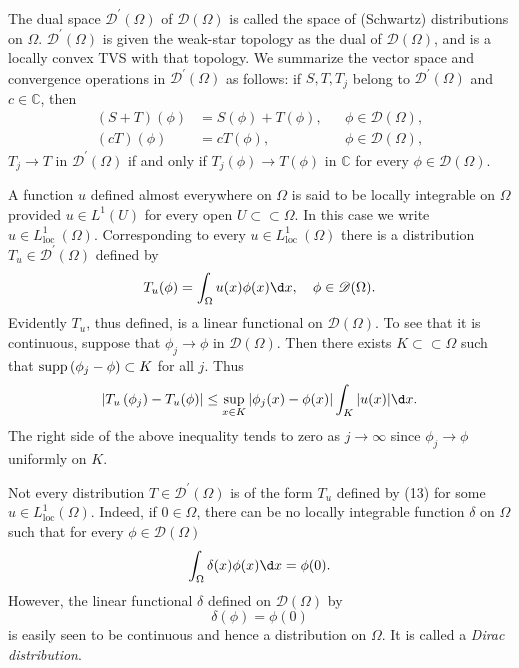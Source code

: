 \begin{para}
  The dual space $\mathscr{D}^{\prime}(\Omega)$ of $\mathscr{D}(\Omega)$ is called the space of 
  (Schwartz) distributions on $\Omega$. $\mathscr{D}^{\prime}(\Omega)$ is given the weak-star 
  topology as the dual of $\mathscr{D}(\Omega)$, and is a locally convex TVS with that topology. 
  We summarize the vector space and convergence operations in $\mathscr{D}^{\prime}(\Omega)$ as 
  follows: if $S, T, T_j$ belong to $\mathscr{D}^{\prime}(\Omega)$ and $c \in \mathbb{C}$, then
  \[
  \begin{aligned}
  (S+T)(\phi) & =S(\phi)+T(\phi), & & \phi \in \mathscr{D}(\Omega), \\
  (c T)(\phi) & =c T(\phi), & & \phi \in \mathscr{D}(\Omega),
  \end{aligned}
  \]
  $T_j \rightarrow T$ in $\mathscr{D}^{\prime}(\Omega)$ if and only if $T_j(\phi) \rightarrow T(\phi)$ in $\mathbb{C}$ for every $\phi \in \mathscr{D}(\Omega)$.
\end{para}


\begin{para}
  A function $u$ defined almost everywhere on $\Omega$ is said to be locally integrable on $\Omega$ provided $u \in L^1(U)$ for every open $U \subset\subset \Omega$. In this case we write $u \in L_{\text {loc }}^1(\Omega)$. Corresponding to every $u \in L_{\text {loc }}^1(\Omega)$ there is a distribution $T_u \in \mathscr{D}^{\prime}(\Omega)$ defined by
  \begin{equation}
    T_u(\phi)=\int_{\Omega} u(x) \phi(x) \d x, \quad \phi \in \mathscr{D}(\Omega).
  \end{equation}
  Evidently $T_u$, thus defined, is a linear functional on $\mathscr{D}(\Omega)$. To see that it is continuous, suppose that $\phi_j \rightarrow \phi$ in $\mathscr{D}(\Omega)$. Then there exists $K \subset\subset \Omega$ such that $\operatorname{supp}\left(\phi_j-\phi\right) \subset K$ for all $j$. Thus
  \[
  \left|T_u\left(\phi_j\right)-T_u(\phi)\right| \leq \sup _{x \in K}\left|\phi_j(x)-\phi(x)\right| \int_K|u(x)| \d x .
  \]
  The right side of the above inequality tends to zero as $j \rightarrow \infty$ since $\phi_j \rightarrow \phi$ uniformly on $K$.
\end{para}

\begin{para}
  Not every distribution $T \in \mathscr{D}^{\prime}(\Omega)$ is of the form $T_u$ defined by (13) for some $u \in L_{\mathrm{loc}}^1(\Omega)$. Indeed, if $0 \in \Omega$, there can be no locally integrable function $\delta$ on $\Omega$ such that for every $\phi \in \mathscr{D}(\Omega)$
  \[
  \int_{\Omega} \delta(x) \phi(x) \d x=\phi(0) .
  \]
  However, the linear functional $\delta$ defined on $\mathscr{D}(\Omega)$ by
  \begin{equation}
    \delta(\phi)=\phi(0)
  \end{equation}
  is easily seen to be continuous and hence a distribution on $\Omega$.
  It is called a \emph{Dirac distribution}.
\end{para}

